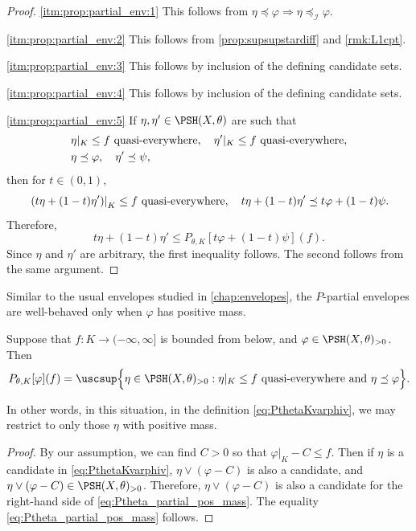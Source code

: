 \begin{proof}
    \ref{itm:prop:partial_env:1} This follows from $\eta\preceq \varphi\Rightarrow \eta\preceq_{\mathcal I}\varphi$.

    \ref{itm:prop:partial_env:2} This follows from \cref{prop:supsupstardiff} and \cref{rmk:L1cpt}.

    \ref{itm:prop:partial_env:3} This follows by inclusion of the defining candidate sets.

    \ref{itm:prop:partial_env:4} This follows by inclusion of the defining candidate sets.

    \ref{itm:prop:partial_env:5} If $\eta,\eta'\in \PSH(X,\theta)$ are such that
    \[
    \begin{split}
        &\eta|_K\leq f\textup{ quasi-everywhere},\quad \eta'|_K\leq f\textup{ quasi-everywhere},\\
        &\eta\preceq \varphi,\quad \eta'\preceq \psi,
    \end{split}
    \]
    then for $t\in (0,1)$,
    \[
        \left.\left(t\eta+(1-t)\eta'\right)\right|_K\leq f\textup{ quasi-everywhere},\quad t\eta+(1-t)\eta' \preceq t\varphi+(1-t)\psi.
    \]
    Therefore,
    \[
    t\eta+(1-t)\eta'\leq P_{\theta,K}\left[t\varphi+(1-t)\psi\right](f).
    \]
    Since $\eta$ and $\eta'$ are arbitrary, the first inequality follows. The second follows from the same argument.
\end{proof}

Similar to the usual envelopes studied in \cref{chap:envelopes}, the $P$-partial envelopes are well-behaved only when $\varphi$ has positive mass.

\begin{lemma}\label{lma:pos_mass_partial}
    Suppose that $f\colon K\rightarrow (-\infty,\infty]$ is bounded from below, and $\varphi\in \PSH(X,\theta)_{>0}$. Then
    \begin{equation}\label{eq:Ptheta_partial_pos_mass}
    P_{\theta,K}[\varphi](f)= \uscsup \Bigl\{ \eta \in \PSH(X,\theta)_{>0}: \eta|_K \leq f  \textup{ quasi-everywhere and } \eta\preceq \varphi\Bigr\}.
    \end{equation}
\end{lemma}
In other words, in this situation, in the definition \eqref{eq:PthetaKvarphiv}, we may restrict to only those $\eta$ with positive mass.
\begin{proof}
    By our assumption, we can find $C>0$ so that $\varphi|_K-C\leq f$. Then if $\eta$ is a candidate in \eqref{eq:PthetaKvarphiv}, $\eta\lor (\varphi-C)$ is also a candidate, and $\eta\lor (\varphi-C)\in \PSH(X,\theta)_{>0}$. Therefore, $\eta\lor (\varphi-C)$ is also a candidate for the right-hand side of \eqref{eq:Ptheta_partial_pos_mass}. The equality \eqref{eq:Ptheta_partial_pos_mass} follows.
\end{proof}

